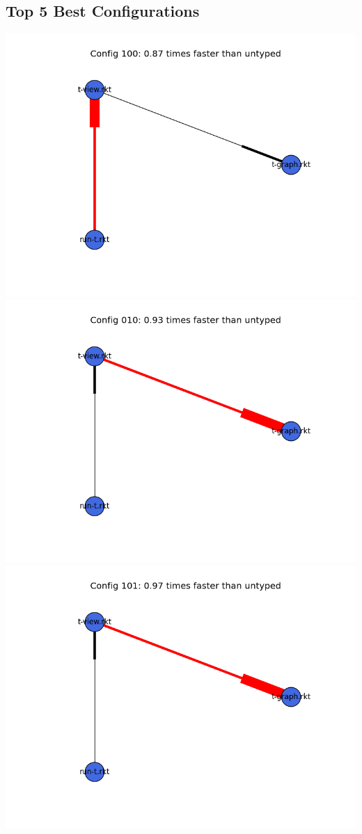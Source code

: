 \documentclass{article}
\begin{document}
\begin{itemize}
\subsection{Top 5 Best Configurations}
\includegraphics[width=\textwidth]{mbta-rs-module-graph-100.png}
\includegraphics[width=\textwidth]{mbta-rs-module-graph-010.png}
\includegraphics[width=\textwidth]{mbta-rs-module-graph-101.png}

\end{itemize}
\end{document}
